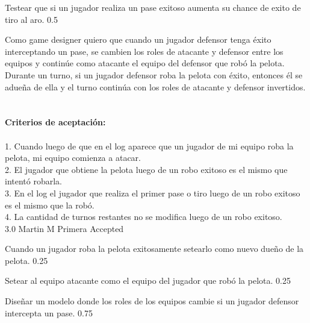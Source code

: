 		{Testear que si un jugador realiza un pase exitoso aumenta su chance de exito de tiro al aro.} %
		{} %
		{0.5} %
		{} %
		{} %
		{} %
\vspace{20pt}


	{Como game designer quiero que cuando un jugador defensor tenga \'exito interceptando un pase, se cambien los roles de atacante y defensor entre los equipos y contin\'ue como atacante el equipo del defensor que rob\'o la pelota.} %
	{Durante un turno, si un jugador defensor roba la pelota con éxito, entonces él se adueña de ella y el turno continúa con los roles de atacante y defensor invertidos. \\
  \\
  \\
\textbf{Criterios de aceptación:}\\
  \\
1. Cuando luego de que en el log aparece que un jugador de mi equipo roba la pelota, mi equipo comienza a atacar. \\
2. El jugador que obtiene la pelota luego de un robo exitoso es el mismo que intentó robarla. \\
3. En el log el jugador que realiza el primer pase o tiro luego de un robo exitoso es el mismo que la robó. \\
4. La cantidad de turnos restantes no se modifica luego de un robo exitoso. \\
} %
	{} %
	{3.0} %
	{Martin M} %
	{Primera} %
	{Accepted} %

		{Cuando un jugador roba la pelota exitosamente setearlo como nuevo dueño de la pelota.} %
		{} %
		{0.25} %
		{} %
		{} %
		{} %

		{Setear al equipo atacante como el equipo del jugador que robó la pelota.} %
		{} %
		{0.25} %
		{} %
		{} %
		{} %

		{Diseñar un modelo donde los roles de los equipos cambie si un jugador defensor intercepta un pase.} %
		{} %
		{0.75} %
		{} %
		{} %
		{} %

